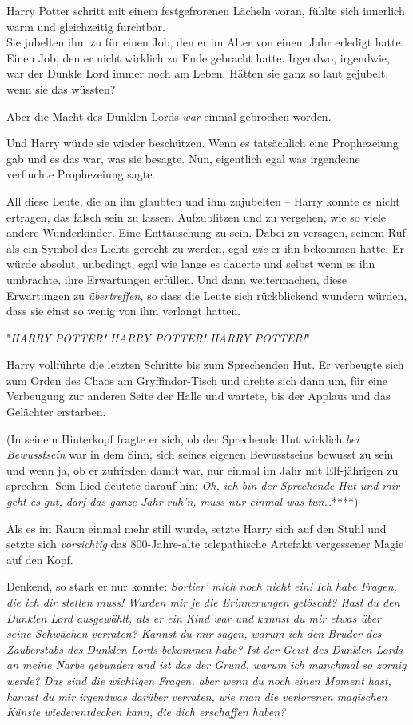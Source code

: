 {Harry Potter schritt mit einem festgefrorenen Lächeln voran, fühlte sich innerlich warm und gleichzeitig furchtbar.\\ Sie jubelten ihm zu für einen Job, den er im Alter von einem Jahr erledigt hatte. Einen Job, den er nicht wirklich zu Ende gebracht hatte. Irgendwo, irgendwie, war der Dunkle Lord immer noch am Leben. Hätten sie ganz so laut gejubelt, wenn sie das wüssten?

Aber die Macht des Dunklen Lords \emph{war} einmal gebrochen worden.

Und Harry würde sie wieder beschützen. Wenn es tatsächlich eine Prophezeiung gab und es das war, was sie besagte. Nun, eigentlich egal was irgendeine verfluchte Prophezeiung sagte.

All diese Leute, die an ihn glaubten und ihm zujubelten -- Harry konnte es nicht ertragen, das falsch sein zu lassen. Aufzublitzen und zu vergehen, wie so viele andere Wunderkinder. Eine Enttäuschung zu sein. Dabei zu versagen, seinem Ruf als ein Symbol des Lichts gerecht zu werden, egal \emph{wie} er ihn bekommen hatte. Er würde absolut, unbedingt, egal wie lange es dauerte und selbst wenn es ihn umbrachte, ihre Erwartungen erfüllen. Und dann weitermachen, diese Erwartungen zu \emph{übertreffen,} so dass die Leute sich rückblickend wundern würden, dass sie einst so wenig von ihm verlangt hatten.

"\emph{HARRY POTTER! HARRY POTTER! HARRY POTTER!}"

Harry vollführte die letzten Schritte bis zum Sprechenden Hut. Er verbeugte sich zum Orden des Chaos am Gryffindor-Tisch und drehte sich dann um, für eine Verbeugung zur anderen Seite der Halle und wartete, bis der Applaus und das Gelächter erstarben.

(In seinem Hinterkopf fragte er sich, ob der Sprechende Hut wirklich \emph{bei Bewusstsein} war in dem Sinn, sich seines eigenen Bewusstseins bewusst zu sein und wenn ja, ob er zufrieden damit war, nur einmal im Jahr mit Elf-jährigen zu sprechen. Sein Lied deutete darauf hin: \emph{Oh, ich bin der Sprechende Hut und mir geht es gut, darf das ganze Jahr ruh'n, muss nur einmal was tun…}****)

Als es im Raum einmal mehr still wurde, setzte Harry sich auf den Stuhl und setzte sich \emph{vorsichtig} das 800-Jahre-alte telepathische Artefakt vergessener Magie auf den Kopf.

Denkend, so stark er nur konnte: \emph{Sortier' mich noch nicht ein! Ich habe Fragen, die ich dir stellen muss! Wurden mir je die Erinnerungen gelöscht? Hast du den Dunklen Lord ausgewählt, als er ein Kind war und kannst du mir etwas über seine Schwächen verraten? Kannst du mir sagen, warum ich den Bruder des Zauberstabs des Dunklen Lords bekommen habe? Ist der Geist des Dunklen Lords an meine Narbe gebunden und ist das der Grund, warum ich manchmal so zornig werde? Das sind die wichtigen Fragen, aber wenn du noch einen Moment hast, kannst du mir irgendwas darüber verraten, wie man die verlorenen magischen Künste wiederentdecken kann, die dich erschaffen haben?}

}
